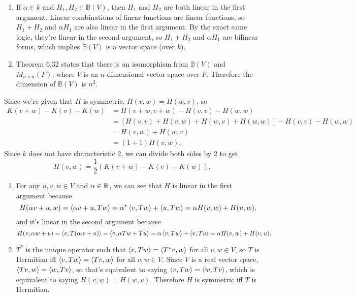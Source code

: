 \documentclass{article}
\begin{document}
\bigskip
\par
\begin{prob}
\end{prob}
\begin{enumerate}[label=(\alph*)]
    \item If $\alpha \in k$ and $H_1, H_2 \in \mathbb{B}(V)$, then $H_1$ and $H_2$ are both linear in the first argument. Linear combinations of linear functions are linear functions, so $H_1+H_2$ and $\alpha H_1$ are also linear in the first argument. By the exact same logic, they're linear in the second argument, so $H_1+H_2$ and $\alpha H_1$ are bilinear forms, which implies $\mathbb{B}(V)$ is a vector space (over $k$).
    \item Theorem 6.32 states that there is an isomorphism from $\mathbb{B}(V)$ and $M_{n \times n}(F)$, where $V$ is an $n$-dimensional vector space over $F$. Therefore the dimension of $\mathbb{B}(V)$ is $n^2$.
\end{enumerate}

\bigskip
\par
\begin{prob}
\end{prob}
Since we're given that $H$ is symmetric, $H(v,w)=H(w,v)$, so
\begin{align*}
    K(v+w)-K(v)-K(w)&=H(v+w,v+w)-H(v,v)-H(w,w) \\
                    &= \left[ H(v,v)+H(v,w)+H(w,v)+H(w,w) \right] - H(v,v)-H(w,w) \\
                    &= H(v,w) + H(w,v) \\
                    &= (1+1)H(v,w).
\end{align*}
Since $k$ does not have characteristic 2, we can divide both sides by 2 to get
\[ H(v,w) = \frac{1}{2} \left( K(v+w)-K(v)-K(w) \right). \]

\bigskip
\par
\begin{prob}
\end{prob}
\begin{enumerate}[label=(\alph*)]
    \item For any $u,v,w \in V$ and $\alpha \in \mathbb{R}$, we can see that $H$ is linear in the first argument because
        \[ H(\alpha v + u, w) = \left\langle \alpha v + u, Tw \right\rangle = \alpha^* \left\langle v, Tw \right\rangle + \left\langle u, Tw \right\rangle = \alpha H(v, w) + H(u, w), \]
        and it's linear in the second argument because
        \[ H(v, \alpha w + u) = \left\langle v, T(\alpha w + u) \right\rangle = \left\langle v, \alpha Tw + Tu \right\rangle = \alpha \left\langle v, Tw \right\rangle + \left\langle v, Tu \right\rangle = \alpha H(v,w) + H(v,u). \]
    \item $T^*$ is the unique operator such that $\left\langle v, Tw \right\rangle=\left\langle T^*v, w \right\rangle$ for all $v, w \in V$, so $T$ is Hermitian iff $\left\langle v, Tw \right\rangle = \left\langle Tv, w \right\rangle$ for all $v, w \in V$. Since $V$ is a real vector space, $\left\langle Tv, w \right\rangle=\left\langle w, Tv \right\rangle$, so that's equivalent to saying $\left\langle v, Tw \right\rangle = \left\langle w, Tv \right\rangle$, which is equivalent to saying $H(v,w)=H(w,v)$. Therefore $H$ is symmetric iff $T$ is Hermitian.
\end{enumerate}
\end{document}
